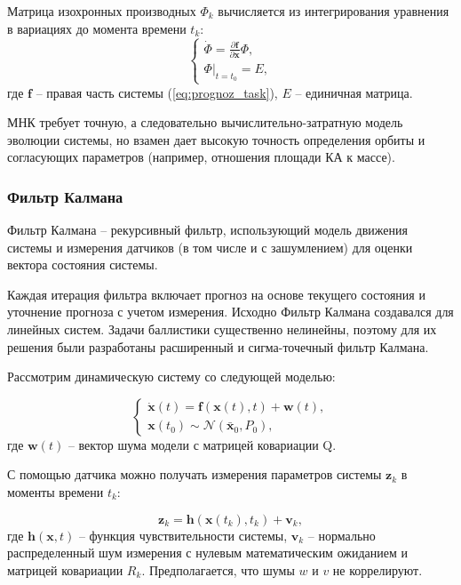Матрица изохронных производных $\Phi_k$ вычисляется 
из интегрирования уравнения в вариациях до момента времени $t_k$:
\begin{equation}
    \begin{cases}
        \dot{\Phi} = \frac{\partial \mathbf{f}}{\partial \mathbf{x}} \Phi, \\
        \Phi \big|_{t = t_0} = E,
        \label{eq:prognoz_phi}
    \end{cases}
\end{equation}
где $\mathbf{f}$ -- правая часть системы (\ref{eq:prognoz_task}), $E$ -- единичная матрица.

МНК требует точную, а следовательно вычислительно-затратную модель эволюции системы, но
взамен дает высокую точность определения орбиты и согласующих параметров (например,
отношения площади КА к массе).

\subsubsection{Фильтр Калмана}
Фильтр Калмана -- рекурсивный фильтр, использующий модель движения системы и
измерения датчиков (в том числе и с зашумлением) для оценки вектора состояния системы.

Каждая итерация фильтра включает прогноз на основе текущего состояния и уточнение прогноза
с учетом измерения. Исходно Фильтр Калмана создавался для линейных систем. Задачи
баллистики существенно нелинейны, поэтому для их решения были разработаны 
расширенный и сигма-точечный фильтр Калмана. 

Рассмотрим динамическую систему со следующей моделью:

\begin{equation*}
    \begin{cases}
        \dot{\mathbf{x}}(t) = \mathbf{f}(\mathbf{x}(t), t) + \mathbf{w}(t), \\
        \mathbf{x}(t_0) \sim \mathcal{N}\left(\bar{\mathbf{x}}_0, P_0 \right),
    \end{cases}
\end{equation*}
где $\mathbf{w}(t)$ -- вектор шума модели с матрицей ковариации Q.

С помощью датчика можно получать измерения параметров системы $\mathbf{z}_k$ в моменты времени $t_k$:

\begin{equation*}
    \mathbf{z}_k = \mathbf{h} (\mathbf{x}(t_k), t_k) + \mathbf{v}_k,
\end{equation*}
где $\mathbf{h} (\mathbf{x}, t)$ -- функция чувствительности системы, $\mathbf{v}_k$ --
нормально распределенный шум измерения с нулевым математическим ожиданием и матрицей
ковариации $R_k$. Предполагается, что шумы $w$ и $v$ не коррелируют.

